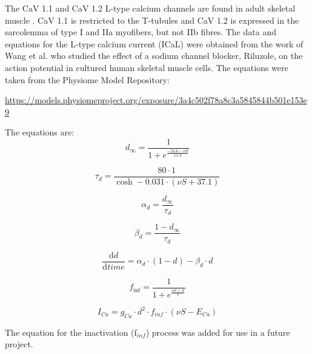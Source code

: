\documentclass[fleqn,10pt]{physiome}
\begin{document}
The CaV 1.1 and CaV 1.2 L-type calcium channels are found in adult skeletal muscle \citep{jeftinija2007cav, flucher2017and} . CaV 1.1 is restricted to the T-tubules and CaV 1.2 is expressed in the sarcolemma of type I and IIa myofibers, but not IIb fibres.   The data and equations for the L-type calcium current (ICaL) were obtained from the work of Wang et al. \citep{wang2008riluzole} who studied the effect of a sodium channel blocker, Riluzole, on the action potential in cultured human skeletal muscle cells. The equations were taken from the Physiome Model Repository: 

\url{https://models.physiomeproject.org/exposure/3a4c502f78a8c3a5845844b501e153e9}\newline

The equations are:
\begin{equation}
d_{\infty} = \frac{\displaystyle 1}{\displaystyle 1+ e^{\frac{\scriptstyle -24.6-\nu{S}}{\scriptstyle 11.3}}}
\end{equation}

\begin{equation}
\tau_d = \frac{\displaystyle 80\cdot 1}{\displaystyle \cosh -0.031\cdot \left( \nu{S}+37.1 \right)}
\end{equation}

\begin{equation}
\alpha_{d} = \frac{\displaystyle d_{\infty}}{\displaystyle \tau_{d}} 
\end{equation}

\begin{equation}
\beta_{d} = \frac{\displaystyle 1-d_{\infty}}{\displaystyle \tau_{d}} 
\end{equation}

\begin{equation}
\frac{\displaystyle \textrm{d}d}{\displaystyle \textrm{d}time} = \alpha_{d}\cdot \left( 1-d \right) -\beta_{d}\cdot d
\end{equation}

\begin{equation}
f_{\inf} = \frac{1}{1+e^\frac{\nu{S}+S}{7}}
\end{equation}

\begin{equation}
I_{Ca} = g_{Ca}\cdot d^{\scriptstyle 2}\cdot f_{inf}\cdot \left( \nu{S}-E_{Ca} \right)     
\end{equation}

The equation for the inactivation (f$_{inf}$) process was added for use in a future project.\newline 
\end{document}
